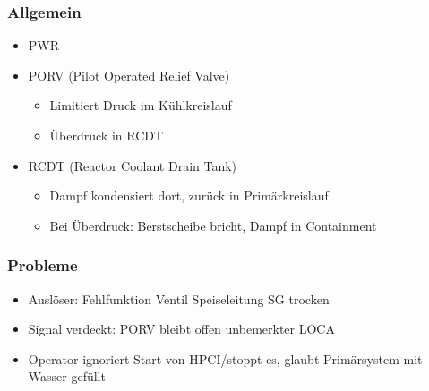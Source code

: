 \documentclass[12pt]{article}
\begin{document}
\subsubsection{Allgemein}
\begin{itemize}
	\item PWR
	\item PORV (Pilot Operated Relief Valve)
		\begin{itemize}
			\item Limitiert Druck im Kühlkreislauf
			\item Überdruck in RCDT
		\end{itemize}
	\item RCDT (Reactor Coolant Drain Tank)
		\begin{itemize}
			\item Dampf kondensiert dort, zurück in Primärkreislauf
			\item Bei Überdruck: Berstscheibe bricht, Dampf in Containment
		\end{itemize}
\end{itemize}

\subsubsection{Probleme}
\begin{itemize}
	\item Auslöser: Fehlfunktion Ventil Speiseleitung \textrightarrow SG trocken
	\item Signal verdeckt: PORV bleibt offen \textrightarrow unbemerkter LOCA
	\item Operator ignoriert Start von HPCI/stoppt es, glaubt Primärsystem mit Wasser gefüllt
\end{itemize}
\end{document}
